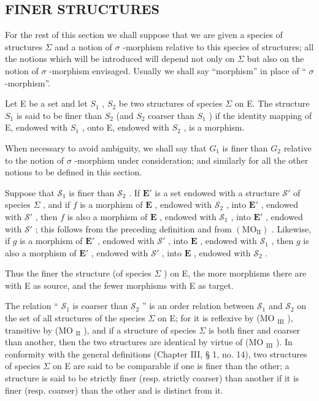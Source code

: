 \subsection{FINER STRUCTURES}

For the rest of this section we shall suppose that we are given a species of structures \(\Sigma\) and a notion of \(\sigma\) -morphism relative to this species of structures; all the notions which will be introduced will depend not only on \(\Sigma\) but also on the notion of \(\sigma\) -morphism envisaged. Usually we shall say ``morphism'' in place of `` \(\sigma\) -morphism''.

Let E be a set and let \(S_{1}\) , \(S_{2}\) be two structures of species \(\Sigma\) on E. The structure \(S_{1}\) is said to be finer than \(S_{2}\) (and \(S_{2}\) coarser than \(S_{1}\) ) if the identity mapping of E, endowed with \(S_{1}\) , onto E, endowed with \(S_{2}\) , is a morphism.

When necessary to avoid ambiguity, we shall say that \(G_{1}\) is finer than \(G_{2}\) relative to the notion of \(\sigma\) -morphism under consideration; and similarly for all the other notions to be defined in this section.

Suppose that \(\mathcal{S}_1\) is finer than \(\mathcal{S}_2\) . If \(\mathbf{E}'\) is a set endowed with a structure \(\mathcal{S}'\) of species \(\Sigma\) , and if \(f\) is a morphism of \(\mathbf{E}\) , endowed with \(\mathcal{S}_2\) , into \(\mathbf{E}'\) , endowed with \(\mathcal{S}'\) , then \(f\) is also a morphism of \(\mathbf{E}\) , endowed with \(\mathcal{S}_1\) , into \(\mathbf{E}'\) , endowed with \(\mathcal{S}'\) ; this follows from the preceding definition and from \((\mathrm{MO}_{\mathrm{II}})\) . Likewise, if \(g\) is a morphism of \(\mathbf{E}'\) , endowed with \(\mathcal{S}'\) , into \(\mathbf{E}\) , endowed with \(\mathcal{S}_1\) , then \(g\) is also a morphism of \(\mathbf{E}'\) , endowed with \(\mathcal{S}'\) , into \(\mathbf{E}\) , endowed with \(\mathcal{S}_2\) .

Thus the finer the structure (of species \(\Sigma\) ) on E, the more morphisms there are with E as source, and the fewer morphisms with E as target.

The relation `` \(\mathcal{S}_{1}\) is coarser than \(\mathcal{S}_{2}\) '' is an order relation between \(\mathcal{S}_{1}\) and \(\mathcal{S}_{2}\) on the set of all structures of the species \(\Sigma\) on E; for it is reflexive by (MO \(_{\text{III}}\) ), transitive by (MO \(_{\text{II}}\) ), and if a structure of species \(\Sigma\) is both finer and coarser than another, then the two structures are identical by virtue of (MO \(_{\text{III}}\) ). In conformity with the general definitions (Chapter III, § 1, no. 14), two structures of species \(\Sigma\) on E are said to be comparable if one is finer than the other; a structure is said to be strictly finer (resp. strictly coarser) than another if it is finer (resp. coarser) than the other and is distinct from it.

